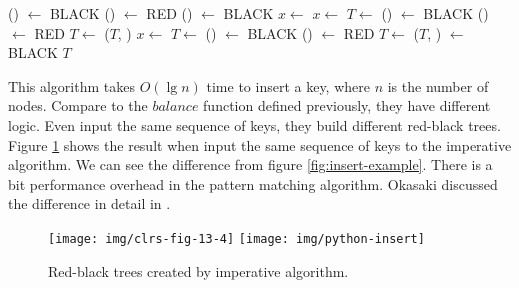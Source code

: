\documentclass[b5paper]{article}
\begin{document}
\begin{algorithmic}[1]
      \State {}() $\gets$ BLACK
      \State {}() $\gets$ RED
      \State {}() $\gets$ BLACK
      \State $x \gets$ 
    \Else
          \State $x \gets$ 
          \State $T \gets$ 
        \EndIf
        \State {}() $\gets$ BLACK
        \State {}() $\gets$ RED
        \State $T \gets$ ($T$, )
      \Else
          \State $x \gets$ 
          \State $T \gets$ 
        \EndIf
        \State {}() $\gets$ BLACK
        \State {}() $\gets$ RED
        \State $T \gets$ ($T$, )
      \EndIf
    \EndIf
  \EndWhile
  \State {} $\gets$ BLACK
  \State \Return $T$
\EndFunction
\end{algorithmic}

This algorithm takes $O(\lg n)$ time to insert a key, where $n$ is the number of nodes. Compare to the $balance$ function defined previously, they have different logic. Even input the same sequence of keys, they build different red-black trees. Figure \cref{fig:imperative-insert} shows the result when input the same sequence of keys to the imperative algorithm. We can see the difference from figure \cref{fig:insert-example}. There is a bit performance overhead in the pattern matching algorithm. Okasaki discussed the difference in detail in \cite{okasaki}.

\begin{figure}[htbp]
   \centering
   \texttt{[image: img/clrs-fig-13-4]}
   \texttt{[image: img/python-insert]}
   \caption{Red-black trees created by imperative algorithm.}
   \label{fig:imperative-insert}
\end{figure}
\end{document}

